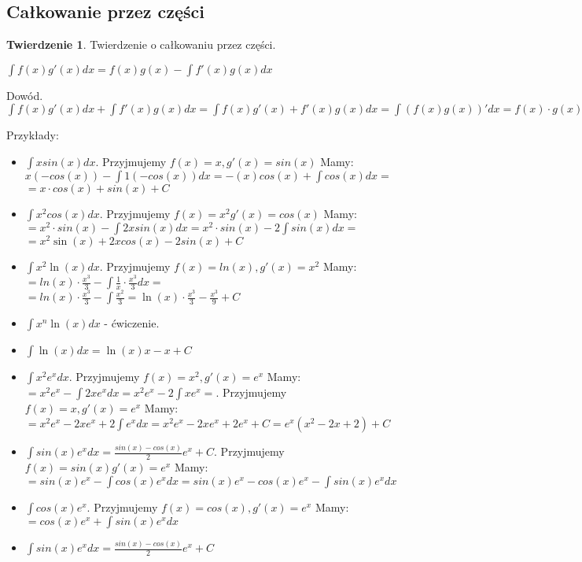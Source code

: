 \documentclass{article}
\theoremstyle{definition}
\theoremstyle{definition}
\newtheorem{tw}{Twierdzenie}[subsection]
\theoremstyle{definition}
\theoremstyle{definition}
\begin{document}
\subsection{Całkowanie przez części}

\begin{tw}
    Twierdzenie o całkowaniu przez części.
    \begin{center}
        $\int f(x) g'(x) dx = f(x) g(x) - \int f'(x) g(x) dx$
    \end{center}
    Dowód.\\
    $\int f(x) g'(x) dx + \int f'(x) g(x) dx = \int f(x)g'(x)+f'(x)g(x) dx = \int (f(x)g(x))' dx = f(x)\cdot g(x)$
\end{tw}
Przykłady:
\begin{itemize}
    \item $\int x sin(x) dx$. Przyjmujemy $f(x)=x, g'(x)=sin(x)$ Mamy:\\
    $x(-cos(x)) - \int 1(-cos(x)) dx = -(x)cos(x) + \int cos(x) dx=$\\
    $=x\cdot cos(x) + sin(x) + C$
    \item $\int x^2 cos(x) dx$. Przyjmujemy $f(x)=x^2 g'(x)=cos(x)$ Mamy:\\
    $=x^2\cdot sin(x) - \int 2x sin(x) dx = x^2 \cdot sin(x) - 2 \int sin(x)dx =$\\
    $=x^2\sin(x)+2xcos(x)-2sin(x)+C$
    \item $\int x^2 \ln(x) dx$. Przyjmujemy $f(x)=ln(x), g'(x)=x^2$ Mamy:\\
    $=ln(x)\cdot\frac{x^3}{3} - \int \frac{1}{x}\cdot\frac{x^3}{3} dx=$\\
    $=ln(x)\cdot\frac{x^3}{3} - \int \frac{x^2}{3} = \ln(x)\cdot\frac{x^3}{3} - \frac{x^3}{9} + C$
    \item $\int x^n \ln(x) dx$ - ćwiczenie.
    \item $\int \ln(x) dx = \ln(x)x-x+C$
    \item $\int x^2 e^x dx$. Przyjmujemy $f(x)=x^2, g'(x)=e^x$ Mamy:\\
    $=x^2e^x-\int 2xe^x dx = x^2e^x - 2\int xe^x =$. Przyjmujemy $f(x)=x, g'(x)=e^x$ Mamy:\\
    $=x^2e^x-2xe^x+2\int e^x dx = x^2e^x-2xe^x+2e^x+C=e^x(x^2-2x+2)+C$
    \item $\int sin(x)e^x dx = \frac{sin(x)-cos(x)}{2} e^x + C$. Przyjmujemy $f(x)=sin(x) g'(x)=e^x$ Mamy:\\
    $=sin(x)e^x - \int cos(x)e^x dx = sin(x)e^x - cos(x)e^x - \int sin(x)e^x dx$
    \item $\int cos(x)e^x$. Przyjmujemy $f(x)=cos(x), g'(x)=e^x$ Mamy:\\
    $=cos(x)e^x + \int sin(x)e^x dx$
    \item $\int sin(x)e^x dx = \frac{sin(x)-cos(x)}{2} e^x + C$ 
\end{itemize}
\end{document}
